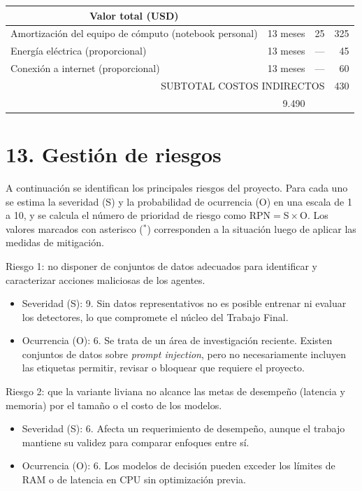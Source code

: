 \documentclass[
11pt, %
]{charter}
\begin{document}
\begin{table}[htpb]
\begin{tabularx}{\linewidth}{@{}|X|c|r|r|@{}}
  \multicolumn{1}{c|}{\cellcolor[HTML]{C0C0C0}Valor total (USD)} \\ \hline
Amortización del equipo de cómputo (notebook personal) & 13 meses & 25 & 325 \\ \hline
Energía eléctrica (proporcional) & 13 meses & --- & 45 \\ \hline
Conexión a internet (proporcional) & 13 meses & --- & 60 \\ \hline
\multicolumn{3}{|r|}{SUBTOTAL COSTOS INDIRECTOS} &
  \multicolumn{1}{r|}{430} \\ \hline
\rowcolor[HTML]{C0C0C0}
\multicolumn{3}{|r|}{\cellcolor[HTML]{C0C0C0}TOTAL} &
  \multicolumn{1}{r|}{\cellcolor[HTML]{C0C0C0}9.490} \\ \hline
\end{tabularx}%
\end{table}


\section{13. Gestión de riesgos}
\label{sec:riesgos}

A continuación se identifican los principales riesgos del proyecto. Para cada uno se estima la severidad (S) y la probabilidad de ocurrencia (O) en una escala de 1 a 10, y se calcula el número de prioridad de riesgo como RPN${}={}$S${}\times{}$O. Los valores marcados con asterisco ($^{*}$) corresponden a la situación luego de aplicar las medidas de mitigación.

Riesgo 1: no disponer de conjuntos de datos adecuados para identificar y caracterizar acciones maliciosas de los agentes.
\begin{itemize}
	\item Severidad (S): 9. Sin datos representativos no es posible entrenar ni evaluar los detectores, lo que compromete el núcleo del Trabajo Final.
	\item Ocurrencia (O): 6. Se trata de un área de investigación reciente. Existen conjuntos de datos sobre \textit{prompt injection}, pero no necesariamente incluyen las etiquetas permitir, revisar o bloquear que requiere el proyecto.
\end{itemize}

Riesgo 2: que la variante liviana no alcance las metas de desempeño (latencia y memoria) por el tamaño o el costo de los modelos.
\begin{itemize}
	\item Severidad (S): 6. Afecta un requerimiento de desempeño, aunque el trabajo mantiene su validez para comparar enfoques entre sí.
	\item Ocurrencia (O): 6. Los modelos de decisión pueden exceder los límites de RAM o de latencia en CPU sin optimización previa.
\end{itemize}
\end{document}
